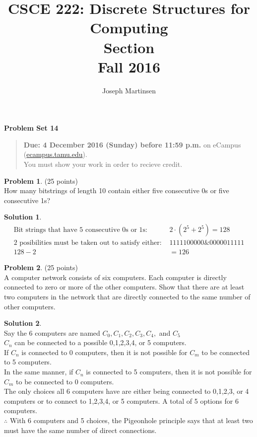 \documentclass{article}
\title{CSCE 222: Discrete Structures for Computing\\Section \mysectionnumber\\Fall 2016}
\author{Joseph Martinsen}
\theoremstyle{definition}
\newtheorem{problem}{Problem}
\newtheorem*{solution}{Solution}
\newcommand{\problemset}[1]{\begin{center}\textbf{Problem Set #1}\end{center}}
\newcommand{\duedate}[1]{\begin{quote}\textbf{Due: #1} on eCampus (\url{ecampus.tamu.edu}). \\You must show your work in order to recieve credit.\end{quote}}
\begin{document}
\maketitle

\problemset{14}

\duedate{4 December 2016 (Sunday) before 11:59 p.m.}

\bigskip

\begin{problem} (25 points)\\
How many bitstrings of length 10 contain either five consecutive 0s or five consecutive 1s?
\end{problem}

\begin{solution}\ \\
  \begin{align*}
    \text{Bit strings that have $5$ consecutive  0s or 1s: } &2 \cdot (2^5 +2^5) = 128 \\
    \text{2 posibilities must be taken out to satisfy either: } &1111100000 \& 0000011111 \\
    128-2 &= 126
  \end{align*}
\end{solution}

\newpage

\begin{problem} (25 points)\\
A computer network consists of six computers.  Each computer is directly connected to zero or more of the other computers.  Show that there are at least two computers in the network that are directly connected to the same number of other computers.
\end{problem}

\begin{solution}\ \\
Say the 6 computers are named $C_0, C_1, C_2, C_3, C_4,$ and $ C_5$ \\
$C_n$ can be connected to a possible 0,1,2,3,4, or 5 computers. \\
If $C_n$ is connected to 0 computers, then it is not possible for $C_m$ to be connected to 5 computers. \\
In the same manner, if $C_n$ is connected to 5 computers, then it is not possible for $C_m$ to be connected to 0 computers. \\
The only choices all 6 computers have are either being connected to 0,1,2,3, or 4 computers or to connect to 1,2,3,4, or 5 computers. A total of 5 options for 6 computers. \\
$\therefore$ With 6 computers and 5 choices, the Pigeonhole principle says that at least two must have the same number of direct connections.
\end{solution}
\end{document}
